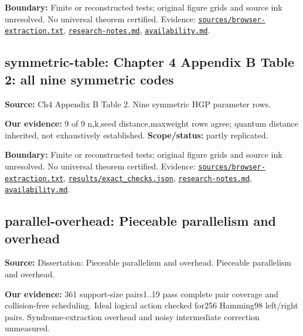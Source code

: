 \documentclass[11pt]{article}
\begin{document}
\textbf{Boundary:} Finite or reconstructed tests; original figure grids and source ink unresolved. No universal theorem certified. Evidence: \href{https://github.com/alectionary/vibe-math/blob/master/formalization/quintavalle-hgp/sources/browser-extraction.txt}{\nolinkurl{sources/browser-extraction.txt}}, \href{https://github.com/alectionary/vibe-math/blob/master/formalization/quintavalle-hgp/research-notes.md}{\nolinkurl{research-notes.md}}, \href{https://github.com/alectionary/vibe-math/blob/master/formalization/quintavalle-hgp/availability.md}{\nolinkurl{availability.md}}.
\subsection{symmetric-table: Chapter 4 Appendix B Table 2: all nine symmetric codes}
\label{claim:symmetric-table}
\textbf{Source:} Ch4 Appendix B Table 2. Nine symmetric HGP parameter rows.

\textbf{Our evidence:} 9 of 9 n,k,seed distance,maxweight rows agree; quantum distance inherited, not exhaustively established. \textbf{Scope/status:} partly replicated.

\textbf{Boundary:} Finite or reconstructed tests; original figure grids and source ink unresolved. No universal theorem certified. Evidence: \href{https://github.com/alectionary/vibe-math/blob/master/formalization/quintavalle-hgp/sources/browser-extraction.txt}{\nolinkurl{sources/browser-extraction.txt}}, \href{https://github.com/alectionary/vibe-math/blob/master/formalization/quintavalle-hgp/results/exact_checks.json}{\nolinkurl{results/exact_checks.json}}, \href{https://github.com/alectionary/vibe-math/blob/master/formalization/quintavalle-hgp/research-notes.md}{\nolinkurl{research-notes.md}}, \href{https://github.com/alectionary/vibe-math/blob/master/formalization/quintavalle-hgp/availability.md}{\nolinkurl{availability.md}}.
\subsection{parallel-overhead: Pieceable parallelism and overhead}
\label{claim:parallel-overhead}
\textbf{Source:} Dissertation: Pieceable parallelism and overhead. Pieceable parallelism and overhead.

\textbf{Our evidence:} 361 support-size pairs1..19 pass complete pair coverage and collision-free scheduling. Ideal logical action checked for256 Hamming98 left/right pairs. Syndrome-extraction overhead and noisy intermediate correction unmeasured.
\end{document}
